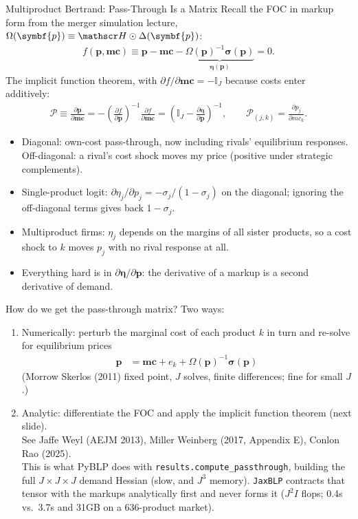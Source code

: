 \documentclass[aspectratio=169,10pt]{beamer}
\begin{document}
\begin{frame}{Multiproduct Bertrand: Pass-Through Is a Matrix}
\small
Recall the FOC in markup form from the merger simulation lecture, $\Omega(\symbf{p}) \equiv \calH \odot \Delta(\symbf{p})$:
\begin{align*}
f(\symbf{p}, \symbf{mc}) \equiv \symbf{p} - \symbf{mc} - \underbrace{\Omega(\symbf{p})^{-1} \symbf{\sigma}(\symbf{p})}_{\symbf{\eta}(\symbf{p})} = 0 .
\end{align*}
The implicit function theorem, with $\partial f/\partial \symbf{mc} = -\mathbb{I}_J$ because costs enter additively:
\begin{align*}
\mathcal{P} \equiv \frac{\partial \symbf{p}}{\partial \symbf{mc}} = -\left(\frac{\partial f}{\partial \symbf{p}}\right)^{-1} \frac{\partial f}{\partial \symbf{mc}}
= \left( \mathbb{I}_J - \frac{\partial \symbf{\eta}}{\partial \symbf{p}} \right)^{-1}, \qquad \mathcal{P}_{(j,k)} = \frac{\partial p_j}{\partial mc_k}.
\end{align*}
\begin{itemize}
\item Diagonal: own-cost pass-through, now including rivals' equilibrium responses. Off-diagonal: a rival's cost shock moves my price (positive under strategic complements).
\item Single-product logit: $\partial \eta_j/\partial p_j = -\sigma_j/(1-\sigma_j)$ on the diagonal; ignoring the off-diagonal terms gives back $1 - \sigma_j$.
\item Multiproduct firms: $\eta_j$ depends on the margins of all sister products, so a cost shock to $k$ moves $p_j$ with no rival response at all.
\item Everything hard is in $\partial \symbf{\eta} / \partial \symbf{p}$: the derivative of a markup is a \alert{second derivative of demand}.
\end{itemize}
\end{frame}


\begin{frame}{How do we get the pass-through matrix?}
Two ways:
\begin{enumerate}
\item Numerically: perturb the marginal cost of each product $k$ in turn and re-solve for equilibrium prices
\begin{align*}
\symbf{p} &=\symbf{mc} + e_k + \Omega(\symbf{p})^{-1} \symbf{\sigma}(\symbf{p})
\end{align*}
(Morrow Skerlos (2011) fixed point, $J$ solves, finite differences; fine for small $J$.)
\item Analytic: differentiate the FOC and apply the implicit function theorem (next slide).\\
See Jaffe Weyl (AEJM 2013), Miller Weinberg (2017, Appendix E), Conlon Rao (2025).\\
\alert{This is what PyBLP does} with \texttt{results.compute\_passthrough}, building the full $J \times J \times J$ demand Hessian (slow, and $J^3$ memory). \texttt{JaxBLP} contracts that tensor with the markups analytically first and never forms it ($J^2 I$ flops; 0.4s vs.\ 3.7s and 31GB on a 636-product market).
\end{enumerate}
\end{frame}
\end{document}
